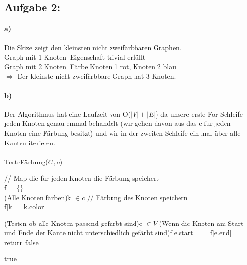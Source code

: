 \documentclass[a4paper]{article}
\begin{document}
\subsection*{Aufgabe 2:}

\paragraph{a)}

Die Skize zeigt den kleinsten nicht zweifärbbaren Graphen. \\
Graph mit 1 Knoten: Eigenschaft trivial erfüllt \\
Graph mit 2 Knoten: Färbe Knoten 1 rot, Knoten 2 blau \\
$\Rightarrow$ Der kleinste nicht zweifärbbare Graph hat 3 Knoten.


\paragraph{b)}
Der Algorithmus hat eine Laufzeit von O($|V| + |E|$) da unsere erste For-Schleife jeden 
Knoten genau einmal behandelt (wir gehen davon aus das c für jeden Knoten eine Färbung
besitzt) und wir in der zweiten Schleife ein mal über alle Kanten iterieren. \\
\\
\noindent TesteFärbung($G, c$)\\
\begin{algorithm}[H]
	// Map die für jeden Knoten die Färbung speichert \\
	f = \{\} \\
	\ForEach(Alle Knoten färben){k $\in c $}{
		// Färbung des Knoten speichern \\
		f[k] = k.color \\
	}

	\ForEach(Testen ob alle Knoten passend gefärbt sind){e $\in V$} {
		\If(Wenn die Knoten am Start und Ende der Kante nicht 
		unterschiedlich gefärbt sind){f[e.start] == f[e.end]}{
			return false
		}
	}

	\Return true \\
\end{algorithm}
\end{document}
